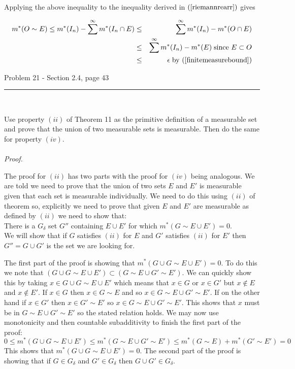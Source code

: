 \documentclass[11pt,reqno]{article}
\begin{document}
\noindent Applying the above inequality to the inequality derived in $(\ref{riemannrearr})$ gives

\begin{eqnarray*}
m^*(O \sim E) \le m^*(I_n) -  \sum^\infty m^*(I_n \cap E) &\le& \sum^\infty m^*(I_n) - m^*(O \cap E) \\
&\le& \sum^\infty m^*(I_n) - m^*(E) \; \text{since $E \subset O$} \\
&\le& \epsilon \; \text{by $(\ref{finitemeasurebound})$}
\end{eqnarray*}

\begin{flushleft} 
Problem 21 - Section 2.4, page 43\\
\rule{500pt}{1pt}\\
\end{flushleft} 

Use property $(ii)$ of Theorem 11 as the primitive definition of a measurable set and prove that the union of two measurable sets is measurable. Then do the same for property $(iv)$.
\\\\ \emph{Proof.}

The proof for $(ii)$ has two parts with the proof for $(iv)$ being analogous. We are told we need to prove that the union of two sets $E$ and $E'$ is measurable given that each set is measurable individually. We need to do this using $(ii)$ of theorem so, explicitly we need to prove that given $E$ and $E'$ are measurable as defined by $(ii)$ we need to show that:\\
\indent There is a $G_\delta$ set $G''$ containing $E \cup E'$ for which $m^*(G \sim E \cup E') = 0$. \\

\noindent We will show that if $G$ satisfies $(ii)$ for $E$ and $G'$ satisfies $(ii)$ for $E'$ then $G'' = G \cup G'$ is the set we are looking for.

The first part of the proof is showing that $m^*(G \cup G \sim E \cup E') = 0$. To do this we note that $(G \cup G \sim E \cup E') \subset (G \sim E \cup G' \sim E')$. We can quickly show this by taking $x \in G \cup G \sim E \cup E'$ which means that $x \in G$ or $x \in G'$ but $x \notin E$ and $x \notin E'$. If $x \in G$ then $x \in G \sim E$ and so $x \in G \sim E \cup G' \sim E'$. If on the other hand if $x \in G'$ then $x \in G' \sim E'$ so $x \in G \sim E \cup G' \sim E'$. This shows that $x$ must be in $G \sim E \cup G' \sim E'$ so the stated relation holds.
We may now use monotonicity and then countable subadditivity to finish the first part of the proof:
\[  0 \le m^*(G \cup G \sim E \cup E') \le m^*(G \sim E \cup G' \sim E') \le m^*(G \sim E) + m^*(G' \sim E') = 0  \]
This shows that $m^*(G \cup G \sim E \cup E') = 0$.  The second part of the proof is showing that if $G \in G_\delta$ and $G' \in G_\delta$ then $G \cup G' \in G_\delta$.
\end{document}
